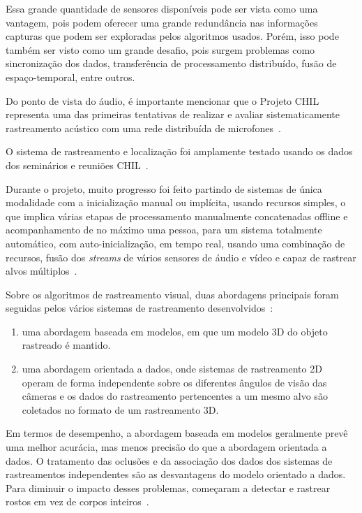 Essa grande quantidade de sensores disponíveis pode ser vista como uma vantagem, pois podem oferecer uma grande redundância nas informações capturas que podem ser exploradas pelos algoritmos usados. Porém, isso pode também ser visto como um grande desafio, pois surgem problemas como sincronização dos dados, transferência de processamento distribuído, fusão de espaço-temporal, entre outros.

Do ponto de vista do áudio, é importante mencionar que o Projeto CHIL representa uma das primeiras tentativas de realizar e avaliar sistematicamente rastreamento acústico com uma rede distribuída de microfones~\cite{chil}.
	 
O sistema de rastreamento e localização foi amplamente testado usando os dados dos seminários e reuniões CHIL~\cite{chil}.

Durante o projeto, muito progresso foi feito partindo de sistemas de única modalidade com a inicialização manual ou implícita, usando recursos simples, o que implica várias etapas de processamento manualmente concatenadas offline e acompanhamento de no máximo uma pessoa, para um sistema totalmente automático, com auto-inicialização, em tempo real, usando uma combinação de recursos, fusão dos \textit{streams} de vários sensores de áudio e vídeo e capaz de rastrear alvos múltiplos~\cite{chil}.

Sobre os algoritmos de rastreamento visual, duas abordagens principais foram seguidas pelos vários sistemas de rastreamento desenvolvidos~\cite{chil}:
	
	\begin{enumerate}
		\item uma abordagem baseada em modelos, em que um modelo 3D do objeto rastreado é mantido.
		\item  uma abordagem orientada a dados, onde sistemas de rastreamento 2D operam de forma independente sobre os diferentes ângulos de visão das câmeras e os dados do rastreamento pertencentes a um mesmo alvo são coletados no formato de um rastreamento 3D.
	\end{enumerate}

 Em termos de desempenho, a abordagem baseada em modelos geralmente prevê uma melhor acurácia, mas menos precisão do que a abordagem orientada a dados. O tratamento das oclusões e da associação dos dados dos sistemas de rastreamentos independentes são as desvantagens do modelo orientado a dados. Para diminuir o impacto desses problemas, começaram a detectar e rastrear rostos em vez de corpos inteiros~\cite{chil}.

